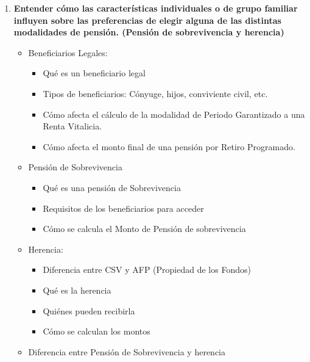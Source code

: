 \begin{enumerate}
\item \textbf{Entender cómo las características individuales o de grupo familiar influyen sobre las preferencias de elegir alguna de las distintas modalidades de pensión. (Pensión de sobrevivencia y herencia)}

\begin{itemize}
    \item Beneficiarios Legales: 
    \begin{itemize}
        \item Qué es un beneficiario legal
        \item Tipos de beneficiarios: Cónyuge, hijos, conviviente civil, etc.
        \item Cómo afecta el cálculo de la modalidad de Periodo Garantizado a una Renta Vitalicia.  
        \item Cómo afecta el monto final de una pensión por Retiro Programado. 
    \end{itemize}
    \item Pensión de Sobrevivencia
    \begin{itemize}
        \item Qué es una pensión de Sobrevivencia 
        \item Requisitos de los beneficiarios para acceder 
        \item Cómo se calcula el Monto de Pensión de sobrevivencia 
    \end{itemize}
    \item Herencia: 
    \begin{itemize}
        \item Diferencia entre CSV y AFP (Propiedad de los Fondos) 
        \item Qué es la herencia 
        \item Quiénes pueden recibirla 
        \item Cómo se calculan los montos 
    \end{itemize}
    \item Diferencia entre Pensión de Sobrevivencia y herencia 
\end{itemize}


\end{enumerate}
